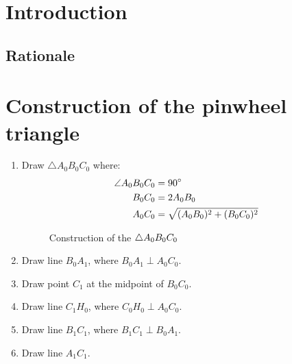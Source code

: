 \section{Introduction}
\subsection{Rationale}

\newpage
\section{Construction of the pinwheel triangle}
\begin{enumerate}
    \item Draw $\triangle A_{0}B_{0}C_{0}$ where:
    \begin{equation}
        \begin{aligned}
            \angle A_{0}B_{0}C_{0} &= 90\degree \\
            B_{0}C_{0} &= 2A_{0}B_{0} \\
            A_{0}C_{0} &= \sqrt{(A_{0}B_{0})^2 + (B_{0}C_{0})^2} \\
        \end{aligned}
    \end{equation}
    \begin{figure}[H]
        \centering
        \label{right-triangle}
        \caption{Construction of the $\protect\triangle A_{0}B_{0}C_{0}$}
    \end{figure}

    \item Draw line $B_{0}A_{1}$, where $B_{0}A_{1} \perp A_{0}C_{0}$.
    \item Draw point $C_{1}$ at the midpoint of $B_{0}C_{0}$.
    \item Draw line $C_{1}H_{0}$, where $C_{0}H_{0} \perp A_{0}C_{0}$.
    \item Draw line $B_{1}C_{1}$, where $B_{1}C_{1} \perp B_{0}A_{1}$.
    \item Draw line $A_{1}C_{1}$.
\end{enumerate}

